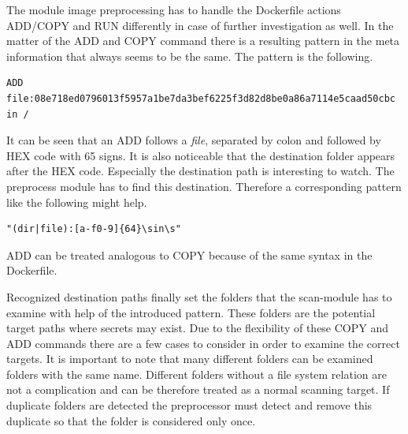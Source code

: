 The module image preprocessing has to handle the Dockerfile actions ADD/COPY and RUN differently in case of further investigation as well.
In the matter of the ADD and COPY command there is a resulting pattern in the meta information that always seems to be the same.
The pattern is the following.
\begin{lstlisting}
ADD file:08e718ed0796013f5957a1be7da3bef6225f3d82d8be0a86a7114e5caad50cbc in /
\end{lstlisting}
It can be seen that an ADD follows a \textit{file}, separated by colon and followed by HEX code with 65 signs. 
It is also noticeable that the destination folder appears after the HEX code.
Especially the destination path is interesting to watch. 
The preprocess module has to find this destination. 
Therefore a corresponding pattern like the following might help.
\begin{lstlisting}
"(dir|file):[a-f0-9]{64}\sin\s"
\end{lstlisting}
ADD can be treated analogous to COPY because of the same syntax in the Dockerfile.

Recognized destination paths finally set the folders that the scan-module has to examine with help of the introduced pattern. 
These folders are the potential target paths where secrets may exist.
Due to the flexibility of these COPY and ADD commands there are a few cases to consider in order to examine the correct targets.
It is important to note that many different folders can be examined folders with the same name.
Different folders without a file system relation are not a complication and can be therefore treated as a normal scanning target. 
If duplicate folders are detected the preprocessor must detect and remove this duplicate so that the folder is considered only once.

